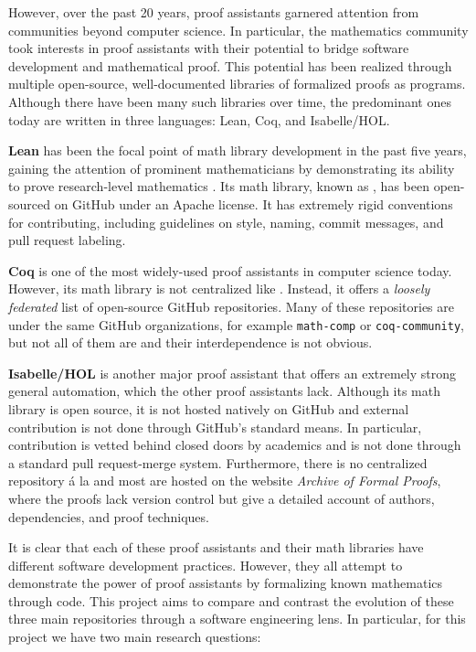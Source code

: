 \documentclass[sigconf,nonacm]{acmart}
\begin{document}
However, over the past 20 years, proof assistants garnered attention from communities beyond computer science. In particular, the mathematics community took interests in proof assistants with their potential to bridge software development and mathematical proof. This potential has been realized through multiple open-source, well-documented libraries of formalized proofs as programs. Although there have been many such libraries over time, the predominant ones today are written in three languages: Lean, Coq, and Isabelle/HOL.

\textbf{Lean} has been the focal point of math library development in the past five years, gaining the attention of prominent mathematicians by demonstrating its ability to prove research-level mathematics . Its math library, known as \mathlib, has been open-sourced on GitHub under an Apache license. It has extremely rigid conventions for contributing, including guidelines on style, naming, commit messages, and pull request labeling. 

\textbf{Coq} is one of the most widely-used proof assistants in computer science today. However, its math library is not centralized like \mathlib. Instead, it offers a \textit{loosely federated} list of open-source GitHub repositories. Many of these repositories are under the same GitHub organizations, for example \texttt{math-comp} or \texttt{coq-community}, but not all of them are and their interdependence is not obvious.

\textbf{Isabelle/HOL} is another major proof assistant that offers an extremely strong general automation, which the other proof assistants lack. Although its math library is open source, it is not hosted natively on GitHub and external contribution is not done through GitHub's standard means. In particular, contribution is vetted behind closed doors by academics and is not done through a standard pull request-merge system. Furthermore, there is no centralized repository \'a la \mathlib and most are hosted on the website \textit{Archive of Formal Proofs}, where the proofs lack version control but give a detailed account of authors, dependencies, and proof techniques.

It is clear that each of these proof assistants and their math libraries have different software development practices. However, they all attempt to demonstrate the power of proof assistants by formalizing known mathematics through code. This project aims to compare and contrast the evolution of these three main repositories through a software engineering lens. In particular, for this project we have two main research questions:
\end{document}
